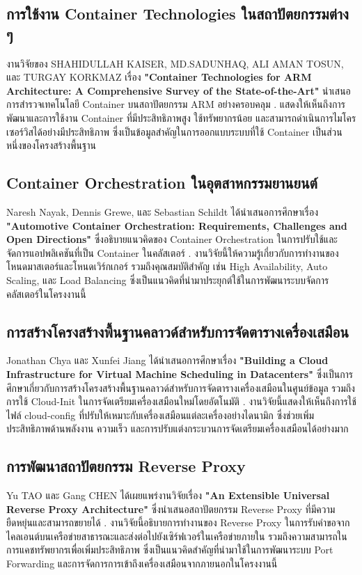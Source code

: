\subsection{การใช้งาน Container Technologies ในสถาปัตยกรรมต่าง ๆ}
\hspace*{1.3em} %
งานวิจัยของ SHAHIDULLAH KAISER, MD.SADUNHAQ, ALI AMAN TOSUN, และ TURGAY KORKMAZ เรื่อง \textbf{"Container Technologies for ARM Architecture: A Comprehensive Survey of the State-of-the-Art"} นำเสนอการสำรวจเทคโนโลยี Container บนสถาปัตยกรรม ARM อย่างครอบคลุม \parencite{kaiser2022_container_arm}. แสดงให้เห็นถึงการพัฒนาและการใช้งาน Container ที่มีประสิทธิภาพสูง ใช้ทรัพยากรน้อย และสามารถดำเนินการไมโครเซอร์วิสได้อย่างมีประสิทธิภาพ ซึ่งเป็นข้อมูลสำคัญในการออกแบบระบบที่ใช้ Container เป็นส่วนหนึ่งของโครงสร้างพื้นฐาน

\subsection{Container Orchestration ในอุตสาหกรรมยานยนต์}
\hspace*{1.3em} %
Naresh Nayak, Dennis Grewe, และ Sebastian Schildt ได้นำเสนอการศึกษาเรื่อง \textbf{"Automotive Container Orchestration: Requirements, Challenges and Open Directions"} ซึ่งอธิบายแนวคิดของ Container Orchestration ในการปรับใช้และจัดการแอปพลิเคชันที่เป็น Container ในคลัสเตอร์ \parencite{nayak2023_automotive_orchestration}. งานวิจัยนี้ให้ความรู้เกี่ยวกับการทำงานของโหนดมาสเตอร์และโหนดเวิร์กเกอร์ รวมถึงคุณสมบัติสำคัญ เช่น High Availability, Auto Scaling, และ Load Balancing ซึ่งเป็นแนวคิดที่นำมาประยุกต์ใช้ในการพัฒนาระบบจัดการคลัสเตอร์ในโครงงานนี้

\subsection{การสร้างโครงสร้างพื้นฐานคลาวด์สำหรับการจัดตารางเครื่องเสมือน}
\hspace*{1.3em} %
Jonathan Chya และ Xunfei Jiang ได้นำเสนอการศึกษาเรื่อง \textbf{"Building a Cloud Infrastructure for Virtual Machine Scheduling in Datacenters"} ซึ่งเป็นการศึกษาเกี่ยวกับการสร้างโครงสร้างพื้นฐานคลาวด์สำหรับการจัดตารางเครื่องเสมือนในศูนย์ข้อมูล รวมถึงการใช้ Cloud-Init ในการจัดเตรียมเครื่องเสมือนใหม่โดยอัตโนมัติ \parencite{chya2024_vm_scheduling}. งานวิจัยนี้แสดงให้เห็นถึงการใช้ไฟล์ cloud-config ที่ปรับให้เหมาะกับเครื่องเสมือนแต่ละเครื่องอย่างไดนามิก ซึ่งช่วยเพิ่มประสิทธิภาพด้านพลังงาน ความเร็ว และการปรับแต่งกระบวนการจัดเตรียมเครื่องเสมือนได้อย่างมาก

\subsection{การพัฒนาสถาปัตยกรรม Reverse Proxy}
\hspace*{1.3em} %
Yu TAO และ Gang CHEN ได้เผยแพร่งานวิจัยเรื่อง \textbf{"An Extensible Universal Reverse Proxy Architecture"} ซึ่งนำเสนอสถาปัตยกรรม Reverse Proxy ที่มีความยืดหยุ่นและสามารถขยายได้ \parencite{tao2016_reverse_proxy}. งานวิจัยนี้อธิบายการทำงานของ Reverse Proxy ในการรับคำขอจากไคลเอนต์บนเครือข่ายสาธารณะและส่งต่อไปยังเซิร์ฟเวอร์ในเครือข่ายภายใน รวมถึงความสามารถในการแคชทรัพยากรเพื่อเพิ่มประสิทธิภาพ ซึ่งเป็นแนวคิดสำคัญที่นำมาใช้ในการพัฒนาระบบ Port Forwarding และการจัดการการเข้าถึงเครื่องเสมือนจากภายนอกในโครงงานนี้
